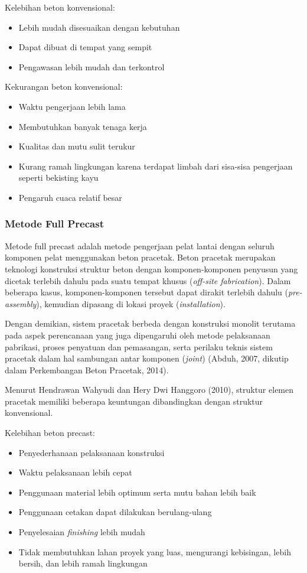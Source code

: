 \documentclass[../modul_skb.tex]{subfiles}
\begin{document}
Kelebihan beton konvensional:

\begin{itemize}
	\item Lebih mudah disesuaikan dengan kebutuhan
	\item Dapat dibuat di tempat yang sempit
	\item Pengawasan lebih mudah dan terkontrol
\end{itemize}

Kekurangan beton konvensional:

\begin{itemize}
	\item Waktu pengerjaan lebih lama
	\item Membutuhkan banyak tenaga kerja
	\item Kualitas dan mutu sulit terukur
	\item Kurang ramah lingkungan karena terdapat limbah dari sisa-sisa pengerjaan seperti bekisting kayu
	\item Pengaruh cuaca relatif besar
\end{itemize}



\subsubsection{Metode Full Precast}

Metode full precast adalah metode pengerjaan pelat lantai dengan seluruh komponen pelat menggunakan beton pracetak. Beton pracetak merupakan teknologi konstruksi struktur beton dengan komponen-komponen penyusun yang dicetak terlebih dahulu pada suatu tempat khusus (\textit{off-site fabrication}). Dalam beberapa kasus, komponen-komponen tersebut dapat dirakit terlebih dahulu (\textit{pre-assembly}), kemudian dipasang di lokasi proyek (\textit{installation}).

Dengan demikian, sistem pracetak berbeda dengan konstruksi monolit terutama pada aspek perencanaan yang juga dipengaruhi oleh metode pelaksanaan pabrikasi, proses penyatuan dan pemasangan, serta perilaku teknis sistem pracetak dalam hal sambungan antar komponen (\textit{joint}) (Abduh, 2007, dikutip dalam Perkembangan Beton Pracetak, 2014).

Menurut Hendrawan Wahyudi dan Hery Dwi Hanggoro (2010), struktur elemen pracetak memiliki beberapa keuntungan dibandingkan dengan struktur konvensional.

Kelebihan beton precast:

\begin{itemize}
	\item Penyederhanaan pelaksanaan konstruksi
	\item Waktu pelaksanaan lebih cepat
	\item Penggunaan material lebih optimum serta mutu bahan lebih baik
	\item Penggunaan cetakan dapat dilakukan berulang-ulang
	\item Penyelesaian \textit{finishing} lebih mudah
	\item Tidak membutuhkan lahan proyek yang luas, mengurangi kebisingan, lebih bersih, dan lebih ramah lingkungan
\end{itemize}
\end{document}
